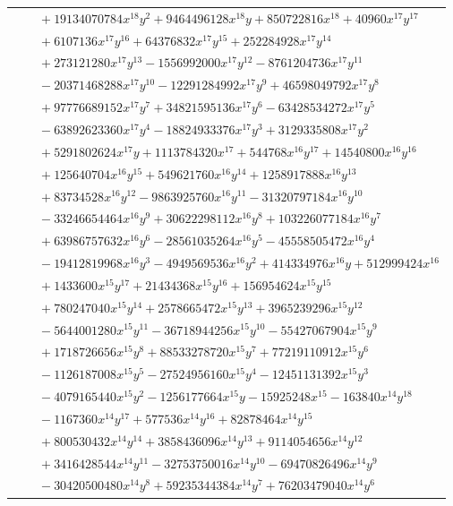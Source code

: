 \documentclass[11pt]{article}
\begin{document}
\begin{longtable}{@{}ll@{}}
 & $\quad +19134070784x^{18}y^{2}+9464496128x^{18}y+850722816x^{18}+40960x^{17}y^{17}$\\
 & $\quad +6107136x^{17}y^{16}+64376832x^{17}y^{15}+252284928x^{17}y^{14}$\\
 & $\quad +273121280x^{17}y^{13}-1556992000x^{17}y^{12}-8761204736x^{17}y^{11}$\\
 & $\quad -20371468288x^{17}y^{10}-12291284992x^{17}y^{9}+46598049792x^{17}y^{8}$\\
 & $\quad +97776689152x^{17}y^{7}+34821595136x^{17}y^{6}-63428534272x^{17}y^{5}$\\
 & $\quad -63892623360x^{17}y^{4}-18824933376x^{17}y^{3}+3129335808x^{17}y^{2}$\\
 & $\quad +5291802624x^{17}y+1113784320x^{17}+544768x^{16}y^{17}+14540800x^{16}y^{16}$\\
 & $\quad +125640704x^{16}y^{15}+549621760x^{16}y^{14}+1258917888x^{16}y^{13}$\\
 & $\quad +83734528x^{16}y^{12}-9863925760x^{16}y^{11}-31320797184x^{16}y^{10}$\\
 & $\quad -33246654464x^{16}y^{9}+30622298112x^{16}y^{8}+103226077184x^{16}y^{7}$\\
 & $\quad +63986757632x^{16}y^{6}-28561035264x^{16}y^{5}-45558505472x^{16}y^{4}$\\
 & $\quad -19412819968x^{16}y^{3}-4949569536x^{16}y^{2}+414334976x^{16}y+512999424x^{16}$\\
 & $\quad +1433600x^{15}y^{17}+21434368x^{15}y^{16}+156954624x^{15}y^{15}$\\
 & $\quad +780247040x^{15}y^{14}+2578665472x^{15}y^{13}+3965239296x^{15}y^{12}$\\
 & $\quad -5644001280x^{15}y^{11}-36718944256x^{15}y^{10}-55427067904x^{15}y^{9}$\\
 & $\quad +1718726656x^{15}y^{8}+88533278720x^{15}y^{7}+77219110912x^{15}y^{6}$\\
 & $\quad -1126187008x^{15}y^{5}-27524956160x^{15}y^{4}-12451131392x^{15}y^{3}$\\
 & $\quad -4079165440x^{15}y^{2}-1256177664x^{15}y-15925248x^{15}-163840x^{14}y^{18}$\\
 & $\quad -1167360x^{14}y^{17}+577536x^{14}y^{16}+82878464x^{14}y^{15}$\\
 & $\quad +800530432x^{14}y^{14}+3858436096x^{14}y^{13}+9114054656x^{14}y^{12}$\\
 & $\quad +3416428544x^{14}y^{11}-32753750016x^{14}y^{10}-69470826496x^{14}y^{9}$\\
 & $\quad -30420500480x^{14}y^{8}+59235344384x^{14}y^{7}+76203479040x^{14}y^{6}$\\

\end{longtable}
\end{document}
